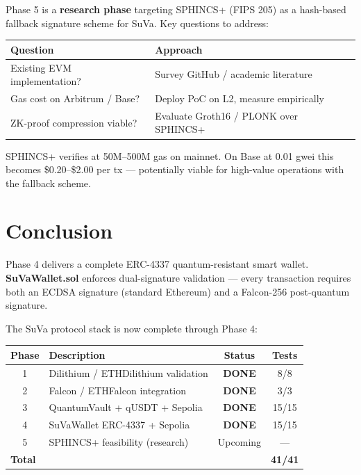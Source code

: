 \documentclass[11pt,a4paper]{article}
\begin{document}
Phase 5 is a \textbf{research phase} targeting SPHINCS+ (FIPS 205) as a hash-based fallback
signature scheme for SuVa. Key questions to address:

\begin{center}
\begin{tabular}{ll}
\toprule
\textbf{Question} & \textbf{Approach} \\
\midrule
Existing EVM implementation? & Survey GitHub / academic literature \\
Gas cost on Arbitrum / Base? & Deploy PoC on L2, measure empirically \\
ZK-proof compression viable? & Evaluate Groth16 / PLONK over SPHINCS+ \\
\bottomrule
\end{tabular}
\end{center}

SPHINCS+ verifies at 50M--500M gas on mainnet. On Base at 0.01 gwei this becomes
\$0.20--\$2.00 per tx --- potentially viable for high-value operations with the fallback scheme.

\section{Conclusion}

Phase 4 delivers a complete ERC-4337 quantum-resistant smart wallet. \textbf{SuVaWallet.sol}
enforces dual-signature validation --- every transaction requires both an ECDSA signature
(standard Ethereum) and a Falcon-256 post-quantum signature.

The SuVa protocol stack is now complete through Phase 4:

\begin{center}
\begin{tabular}{clcc}
\toprule
\textbf{Phase} & \textbf{Description} & \textbf{Status} & \textbf{Tests} \\
\midrule
1  & Dilithium / ETHDilithium validation & \textcolor{pass-green}{\textbf{DONE}} &  8/8 \\
2  & Falcon / ETHFalcon integration      & \textcolor{pass-green}{\textbf{DONE}} &  3/3 \\
3  & QuantumVault + qUSDT + Sepolia      & \textcolor{pass-green}{\textbf{DONE}} & 15/15 \\
4  & SuVaWallet ERC-4337 + Sepolia       & \textcolor{pass-green}{\textbf{DONE}} & 15/15 \\
5  & SPHINCS+ feasibility (research)     & Upcoming & --- \\
\midrule
\multicolumn{2}{l}{\textbf{Total}} & & \textbf{41/41} \\
\bottomrule
\end{tabular}
\end{center}
\end{document}
